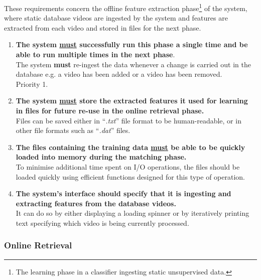 These requirements concern the offline feature extraction phase\footnote{The learning phase in a classifier ingesting static unsupervised data.} of the system, where static database videos are ingested by the system and features are extracted from each video and stored in files for the next phase.

\begin{enumerate}
    \item \textbf{The system \underline{must} successfully run this phase a single time and be able to run multiple times in the next phase}.\\
    The system \textbf{must} re-ingest the data whenever a change is carried out in the database e.g. a video has been added or a video has been removed.\\
    Priority 1.
    
    \item \textbf{The system \underline{must} store the extracted features it used for learning in files for future re-use in the online retrieval phase.}\\
    Files can be saved either in ``\textit{.txt}'' file format to be human-readable, or in other file formats such as ``\textit{.dat}'' files.
    
    \item \textbf{The files containing the training data \underline{must} be able to be quickly loaded into memory during the matching phase.}\\
    To minimise additional time spent on I/O operations, the files should be loaded quickly using efficient functions designed for this type of operation.
    
    
    \item \textbf{The system's interface \underline{}{should} specify that it is ingesting and extracting features from the database videos.}\\
    It can do so by either displaying a loading spinner or by iteratively printing text specifying which video is being currently processed.
\end{enumerate}

\subsubsection{Online Retrieval}

